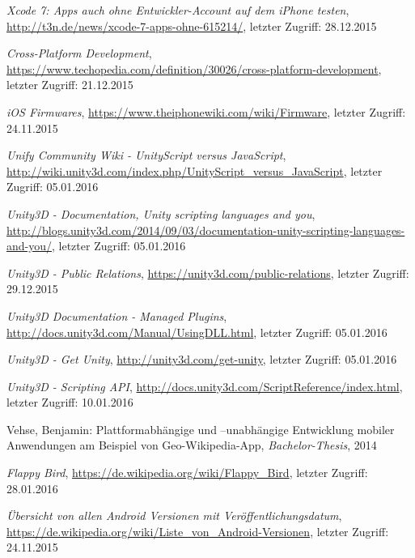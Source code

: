 \begin{thebibliography}{}
\emph{Xcode 7: Apps auch ohne Entwickler-Account auf dem iPhone testen},
\url{http://t3n.de/news/xcode-7-apps-ohne-615214/}, letzter Zugriff: 28.12.2015

\emph{Cross-Platform Development},
\url{https://www.techopedia.com/definition/30026/cross-platform-development}, letzter Zugriff: 21.12.2015

\emph{iOS Firmwares},
\url{https://www.theiphonewiki.com/wiki/Firmware}, letzter Zugriff: 24.11.2015

\emph{Unify Community Wiki - UnityScript versus JavaScript},
\url{http://wiki.unity3d.com/index.php/UnityScript_versus_JavaScript}, letzter Zugriff: 05.01.2016

\emph{Unity3D - Documentation, Unity scripting languages and you},
\url{http://blogs.unity3d.com/2014/09/03/documentation-unity-scripting-languages-and-you/}, letzter Zugriff: 05.01.2016

\emph{Unity3D - Public Relations},
\url{https://unity3d.com/public-relations}, letzter Zugriff: 29.12.2015

\emph{Unity3D Documentation - Managed Plugins},
\url{http://docs.unity3d.com/Manual/UsingDLL.html}, letzter Zugriff: 05.01.2016

\emph{Unity3D - Get Unity},
\url{http://unity3d.com/get-unity}, letzter Zugriff: 05.01.2016

\emph{Unity3D - Scripting API},
\url{http://docs.unity3d.com/ScriptReference/index.html}, letzter Zugriff: 10.01.2016

Vehse, Benjamin:
\glqq Plattformabhängige und –unabhängige
Entwicklung mobiler Anwendungen am
Beispiel von Geo-Wikipedia-App\grqq, 
\emph{Bachelor-Thesis}, 2014

\emph{Flappy Bird},
\url{https://de.wikipedia.org/wiki/Flappy_Bird}, letzter Zugriff: 28.01.2016

\emph{Übersicht von allen Android Versionen mit Veröffentlichungsdatum},
\url{https://de.wikipedia.org/wiki/Liste_von_Android-Versionen}, letzter Zugriff: 24.11.2015


\end{thebibliography}
